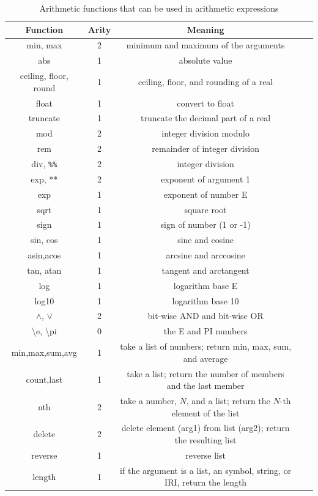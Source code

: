 \documentclass[11pt]{article}
\newcommand{\ERGO}{\mbox{\smaller{\ensuremath{\cal{E}}\smaller{{\sc{RGO}}}}}\xspace}
\newcommand{\FLSYSTEM}{\ERGO}
\newcommand{\bs}{\textbackslash}
\begin{document}
\begin{table}[tbh]
  \center
{ \footnotesize
\begin{tabular}{|c|c|c|c|c|}
\hline
Function  & Arity & Meaning  \\ \hline
min, max & 2 & minimum and maximum of the arguments\\
abs & 1 & absolute value \\
ceiling, floor, round & 1 & ceiling, floor, and rounding of a real \\
float & 1 & convert to float \\
truncate & 1 & truncate the decimal part of a real \\
mod & 2 & integer division modulo \\
rem & 2 & remainder of integer division\\
div, \texttt{\%\%} & 2 & integer division\\
exp, ** & 2 & exponent of argument 1\\
exp & 1 & exponent of number E\\
sqrt & 1 & square root\\
sign & 1 & sign of number (1 or -1)\\
sin, cos & 1 & sine and cosine \\
asin,acos & 1 & arcsine and arccosine\\ 
tan, atan & 1 & tangent and arctangent \\
log & 1 & logarithm base E \\
log10 & 1 & logarithm base 10 \\
$\wedge$, $\vee$ & 2 & bit-wise AND and bit-wise OR \\
\bs{}e, \bs{}pi & 0 & the E and PI numbers\\
  min,max,sum,avg& 1 & take a list of numbers; return min, max,
  sum, and average
  \\
  count,last & 1 & take a list; return the number of members and the last
  member
  \\
  nth & 2 & take a number, $N$, and a list; return the $N$-th element of
  the list
  \\
  delete & 2 & delete element (arg1) from list (arg2); return the resulting list
  \\
  reverse & 1& reverse list
  \\
  length & 1& if the argument is a list, an \FLSYSTEM symbol, string, or IRI,
  return the length
  \\
\hline
\end{tabular}
}
\caption{Arithmetic functions that can be used in arithmetic expressions}
\label{tab:arith-funcs}
\end{table}
\end{document}
